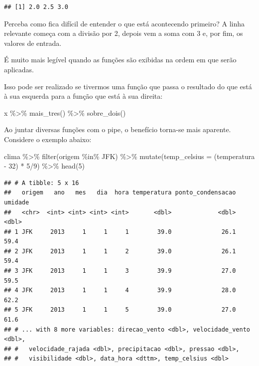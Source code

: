 \documentclass[
]{book}
\newenvironment{Shaded}{\begin{snugshade}}{\end{snugshade}}
\newcommand{\AttributeTok}[1]{\textcolor[rgb]{0.77,0.63,0.00}{#1}}
\newcommand{\DecValTok}[1]{\textcolor[rgb]{0.00,0.00,0.81}{#1}}
\newcommand{\FunctionTok}[1]{\textcolor[rgb]{0.00,0.00,0.00}{#1}}
\newcommand{\NormalTok}[1]{#1}
\newcommand{\SpecialCharTok}[1]{\textcolor[rgb]{0.00,0.00,0.00}{#1}}
\newcommand{\StringTok}[1]{\textcolor[rgb]{0.31,0.60,0.02}{#1}}
\begin{document}
\begin{verbatim}
## [1] 2.0 2.5 3.0
\end{verbatim}

Perceba como fica difícil de entender o que está acontecendo primeiro? A linha
relevante começa com a divisão por 2, depois vem a soma com 3 e, por fim, os
valores de entrada.

É muito mais legível quando as funções são exibidas na ordem em que serão aplicadas.

Isso pode ser realizado se tivermos uma função que passa o resultado do que
está à sua esquerda para a função que está à sua direita:

\begin{Shaded}
\begin{Highlighting}[]
\NormalTok{x }\SpecialCharTok{\%\textgreater{}\%} \FunctionTok{mais\_tres}\NormalTok{() }\SpecialCharTok{\%\textgreater{}\%} \FunctionTok{sobre\_dois}\NormalTok{()}
\end{Highlighting}
\end{Shaded}

Ao juntar diversas funções com o pipe, o benefício torna-se mais aparente.
Considere o exemplo abaixo:

\begin{Shaded}
\begin{Highlighting}[]
\NormalTok{clima }\SpecialCharTok{\%\textgreater{}\%}
  \FunctionTok{filter}\NormalTok{(origem }\SpecialCharTok{\%in\%} \StringTok{\textquotesingle{}JFK\textquotesingle{}}\NormalTok{) }\SpecialCharTok{\%\textgreater{}\%}
  \FunctionTok{mutate}\NormalTok{(}\AttributeTok{temp\_celsius =}\NormalTok{ (temperatura }\SpecialCharTok{{-}} \DecValTok{32}\NormalTok{) }\SpecialCharTok{*} \DecValTok{5}\SpecialCharTok{/}\DecValTok{9}\NormalTok{) }\SpecialCharTok{\%\textgreater{}\%}
  \FunctionTok{head}\NormalTok{(}\DecValTok{5}\NormalTok{)}
\end{Highlighting}
\end{Shaded}

\begin{verbatim}
## # A tibble: 5 x 16
##   origem   ano   mes   dia  hora temperatura ponto_condensacao umidade
##   <chr>  <int> <int> <int> <int>       <dbl>             <dbl>   <dbl>
## 1 JFK     2013     1     1     1        39.0              26.1    59.4
## 2 JFK     2013     1     1     2        39.0              26.1    59.4
## 3 JFK     2013     1     1     3        39.9              27.0    59.5
## 4 JFK     2013     1     1     4        39.9              28.0    62.2
## 5 JFK     2013     1     1     5        39.0              27.0    61.6
## # ... with 8 more variables: direcao_vento <dbl>, velocidade_vento <dbl>,
## #   velocidade_rajada <dbl>, precipitacao <dbl>, pressao <dbl>,
## #   visibilidade <dbl>, data_hora <dttm>, temp_celsius <dbl>
\end{verbatim}
\end{document}
